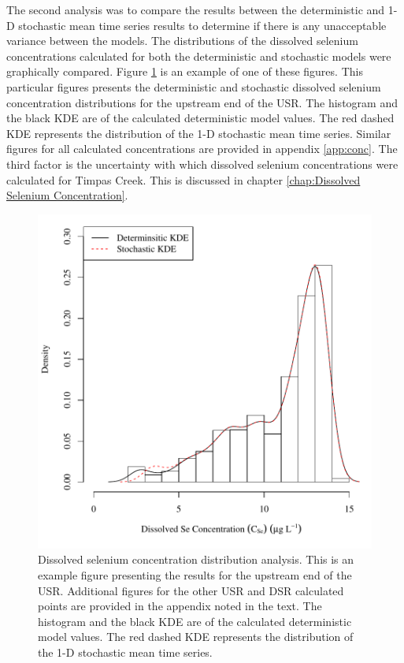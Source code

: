 \begin{linenumbers}
The second analysis was to compare the results between the deterministic and 1-D stochastic mean time series results to determine if there is any unacceptable variance between the models.  The distributions of the dissolved selenium concentrations calculated for both the deterministic and stochastic models were graphically compared.  Figure \ref{fig:ExCSeDist} is an example of one of these figures.  This particular figures presents the deterministic and stochastic dissolved selenium concentration distributions for the upstream end of the USR.  The histogram and the black KDE are of the calculated deterministic model values.  The red dashed KDE represents the distribution of the 1-D stochastic mean time series.  Similar figures for all calculated concentrations are provided in appendix \ref{app:conc}.  The third factor is the uncertainty with which dissolved selenium concentrations were calculated for Timpas Creek.  This is discussed in chapter \ref{chap:Dissolved Selenium Concentration}.

\begin{figure}[htbp]
\centering
	\includegraphics[width=6in]{"Figures/Results_USR/c d&s est U201"}
	\caption[Dissolved selenium concentration distribution analysis.]{Dissolved selenium concentration distribution analysis.  This is an example figure presenting the results for the upstream end of the USR.  Additional figures for the other USR and DSR calculated points are provided in the appendix noted in the text.  The histogram and the black KDE are of the calculated deterministic model values.  The red dashed KDE represents the distribution of the 1-D stochastic mean time series.}
	\label{fig:ExCSeDist}
\end{figure}


\end{linenumbers}

